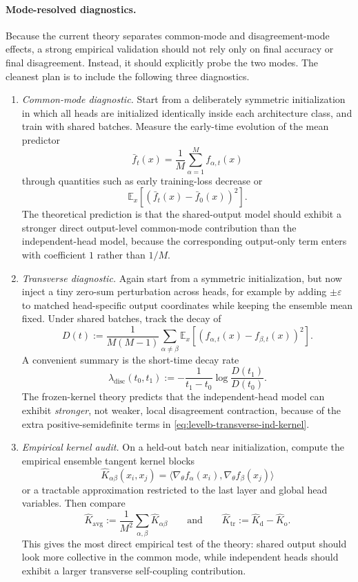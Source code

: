 \documentclass[11pt]{article}
\theoremstyle{definition}
\begin{document}
\paragraph{Mode-resolved diagnostics.}
Because the current theory separates common-mode and disagreement-mode effects,
a strong empirical validation should not rely only on final accuracy or final disagreement.
Instead, it should explicitly probe the two modes.
The cleanest plan is to include the following three diagnostics.
\begin{enumerate}[leftmargin=2em]
  \item \emph{Common-mode diagnostic.}
  Start from a deliberately symmetric initialization in which all heads are initialized identically inside each architecture class,
  and train with shared batches.
  Measure the early-time evolution of the mean predictor
  \[
    \bar f_t(x)=\frac1M\sum_{\alpha=1}^M f_{\alpha,t}(x)
  \]
  through quantities such as early training-loss decrease or
  \[
    \mathbb E_x[(\bar f_t(x)-\bar f_0(x))^2].
  \]
  The theoretical prediction is that the shared-output model should exhibit a stronger direct output-level common-mode contribution than the independent-head model,
  because the corresponding output-only term enters with coefficient $1$ rather than $1/M$.

  \item \emph{Transverse diagnostic.}
  Again start from a symmetric initialization, but now inject a tiny zero-sum perturbation across heads,
  for example by adding $\pm \varepsilon$ to matched head-specific output coordinates while keeping the ensemble mean fixed.
  Under shared batches, track the decay of
  \[
    D(t)
    :=
    \frac{1}{M(M-1)}
    \sum_{\alpha\neq\beta}
    \mathbb E_x[(f_{\alpha,t}(x)-f_{\beta,t}(x))^2].
  \]
  A convenient summary is the short-time decay rate
  \[
    \lambda_{\mathrm{disc}}(t_0,t_1)
    :=
    -\frac{1}{t_1-t_0}
    \log\frac{D(t_1)}{D(t_0)}.
  \]
  The frozen-kernel theory predicts that the independent-head model can exhibit \emph{stronger}, not weaker, local disagreement contraction, because of the extra positive-semidefinite terms in \cref{eq:levelb-transverse-ind-kernel}.

  \item \emph{Empirical kernel audit.}
  On a held-out batch near initialization, compute the empirical ensemble tangent kernel blocks
  \[
    \widehat K_{\alpha\beta}(x_i,x_j)
    =
    \langle \nabla_\theta f_\alpha(x_i),\nabla_\theta f_\beta(x_j)\rangle
  \]
  or a tractable approximation restricted to the last layer and global head variables.
  Then compare
  \[
    \widehat K_{\mathrm{avg}}
    :=
    \frac{1}{M^2}\sum_{\alpha,\beta}\widehat K_{\alpha\beta}
    \qquad\text{and}\qquad
    \widehat K_{\mathrm{tr}}
    :=
    \widehat K_{\mathrm d}-\widehat K_{\mathrm o}.
  \]
  This gives the most direct empirical test of the theory:
  shared output should look more collective in the common mode,
  while independent heads should exhibit a larger transverse self-coupling contribution.
\end{enumerate}
\end{document}
